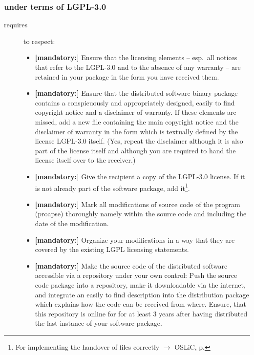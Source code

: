 \subsubsection{under terms of LGPL-3.0}
\begin{description}
\item[requires] to respect:
\begin{itemize}

  \item \textbf{[mandatory:]} Ensure that the licensing elements -- esp.\ all
  notices that refer to the LGPL-3.0 and to the absence of any
  warranty -- are retained in your package in the form you have received them.

  \item \textbf{[mandatory:]} Ensure that the distributed software binary
  package contains a conspicuously and appropriately designed, easily to find
  copyright notice and a disclaimer of warranty. If these elements are missed,
  add a new file containing the main copyright notice and the disclaimer of
  warranty in the form which is textually defined by the license LGPL-3.0
  itself. (Yes, repeat the disclaimer although it is also part of the license
  itself and although you are required to hand the license itself over to the
  receiver.)
  
  \item \textbf{[mandatory:]} Give the recipient a copy of the LGPL-3.0 license.
  If it is not already part of the software package, add it\footnote{For
  implementing the handover of files correctly $\rightarrow$ OSLiC, p.
  \pageref{DistributingFilesHint}}.

  \item \textbf{[mandatory:]} Mark all modifications of source code of the
  program (proapse) thoroughly namely within the source code and including
  the date of the modification.
  
  \item \textbf{[mandatory:]} Organize your modifications in a way that they are
  covered by the existing LGPL licensing statements.
  
  \item \textbf{[mandatory:]} Make the source code of the distributed software
  accessible via a repository under your own control: Push the source code
  package into a repository, make it downloadable via the internet, and
  integrate an easily to find description into the distribution package which
  explains how the code can be received from where. Ensure, that this repository
  is online for for at least 3 years after having distributed the last instance
  of your software package.
  

\end{itemize}
\end{description}
